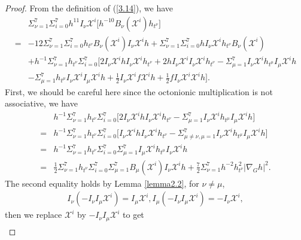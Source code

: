 \documentclass[10pt,a4paper]{amsart}
\numberwithin{equation}{section}
\begin{document}
\begin{proof}
From the definition of (\ref{3.14}), we have
\begin{equation}
    \begin{aligned}
    &\Sigma_{\nu=1}^7\Sigma_{i=0}^7h^{11}I_\nu\mathscr{X}^i \bigg[h^{-10}B_\nu(\mathscr{X}^i)h_{t^\nu}\bigg]\\=&-12\Sigma_{\nu=1}^7\Sigma_{i=0}^7h_{t^\nu}B_\nu(\mathscr{X}^i)I_\nu\mathscr{X}^i h+\Sigma_{\nu=1}^7\Sigma_{i=0}^7 hI_\nu\mathscr{X}^i h_{t^\nu}B_\nu(\mathscr{X}^i)\\&+h^{-1}\Sigma_{\nu=1}^7h_{t^\nu}\Sigma_{i=0}^7\bigg[2I_\nu\mathscr{X}^i h I_\nu\mathscr{X}^i h_{t^\nu}+2h I_\nu\mathscr{X}^i I_\nu\mathscr{X}^i h_{t^\nu}-\Sigma_{\mu=1}^7I_\nu\mathscr{X}^ih_{t^\mu}I_\mu\mathscr{X}^i h\\&-\Sigma_{\mu=1}^7h_{t^\mu}I_\nu\mathscr{X}^iI_\mu\mathscr{X}^i h+\frac{1}{2}I_\nu\mathscr{X}^i f\mathscr{X}^i h+\frac{1}{2}fI_\nu\mathscr{X}^i\mathscr{X}^i h\bigg].
\end{aligned}\end{equation}
First, we should be careful here since the octonionic multiplication is not associative, we have
\begin{equation}
    \begin{aligned}
&h^{-1}\Sigma_{\nu=1}^7h_{t^\nu}\Sigma_{i=0}^7\bigg[2I_\nu\mathscr{X}^i h I_\nu\mathscr{X}^i h_{t^\nu}-\Sigma_{\mu=1}^7I_\nu\mathscr{X}^i h_{t^\mu}I_\mu\mathscr{X}^i h\bigg]\\=&h^{-1}\Sigma_{\nu=1}^7h_{t^{\nu}}\Sigma_{i=0}^7\bigg[I_\nu\mathscr{X}^i h I_\nu\mathscr{X}^i h_{t^\nu}-\Sigma_{\mu\neq \nu,\mu=1}^7I_\nu\mathscr{X}^i h_{t^\mu}I_\mu\mathscr{X}^i h \bigg]\\=&h^{-1}\Sigma_{\nu=1}^7h_{t^\nu}\Sigma_{i=0}^7 \Sigma_{\mu=1}^7I_{\mu}\mathscr{X}^i h_{t^\mu}I_\nu\mathscr{X}^i h\\=&\frac{1}{2}\Sigma_{\nu=1}^7h_{t^\nu}\Sigma_{i=0}^7\Sigma_{\mu=1}^7 B_\mu(\mathscr{X}^i)I_\nu\mathscr{X}^i h+\frac{7}{2}\Sigma_{\nu=1}^7h^{-2}h_{t^\nu}^2|\nabla_G h|^2.
 \end{aligned}
\end{equation}
The second equality holds by Lemma \ref{lemma2.2}, for $\nu\neq \mu$,
\begin{align*}
    I_\nu(-I_\nu I_\mu\mathscr{X}^i)=I_\mu \mathscr{X}^i, I_\mu(-I_\nu I_\mu\mathscr{X}^i)=-I_\nu\mathscr{X}^i,
\end{align*}
then we replace $\mathscr{X}^i$ by $-I_\nu I_\mu \mathscr{X}^i$ to get
\begin{align*}

\end{align*}
\end{proof}
\end{document}
